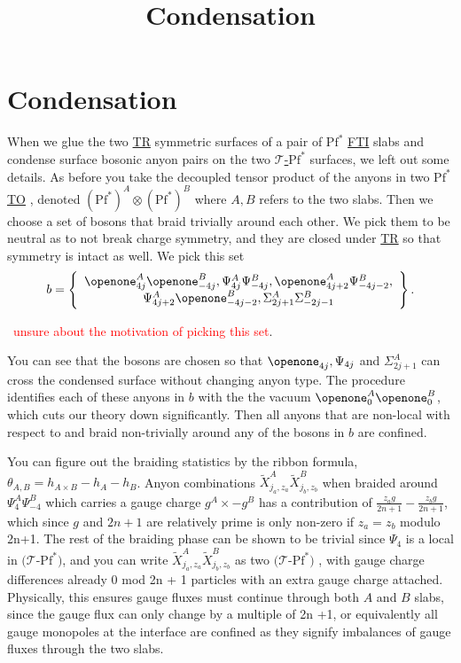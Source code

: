 \documentclass[aps,prl,onecolumn,superscriptaddress,floatfix,12pt,letterpaper,showpacs]{revtex4-1}
\newcommand{\FTI}{\hyperlink{FTI}{FTI} }
\newcommand{\TR}{\hyperlink{TR}{TR} }
\newcommand{\TO}{\hyperlink{TO}{TO} }
\newcommand{\TPf}{\hyperlink{TPf}{$\mathcal{T}$-$\mathrm{Pf}^\ast$} }
\begin{document}
\title{Condensation}

\section{Condensation}

When we glue the two \TR symmetric surfaces of a pair of $\mathrm{Pf}^\ast$ \FTI slabs and condense surface bosonic anyon pairs on the two \TPf surfaces, we left out some details. As before you take the decoupled tensor product of the anyons in two $\mathrm{Pf}^\ast$ \TO, denoted  $(\mathrm{Pf}^\ast)^A\otimes(\mathrm{Pf}^\ast)^B$ where $A,B$ refers to the two slabs. Then we choose a set of bosons that braid trivially around each other. We pick them to be neutral as to not break charge symmetry, and they are closed under \TR so that symmetry is intact as well. We pick this set \
\
\begin{align}
	b=\left\{
		\begin{array}{*{20}c}\openone^A_{4j}\openone^B_{-4j},\Psi^A_{4j}\Psi^B_{-4j},\openone^A_{4j+2}\Psi^B_{-4j-2},				\\\Psi^A_{4j+2}\openone^B_{-4j-2},\Sigma^A_{2j+1}\Sigma^B_{-2j-1}
		\end{array}
	\right\}.\label{bosons}
\end{align}

\
\textcolor{red}{unsure about the motivation of picking this set}.\
\
 


You can see that the bosons are chosen so that $\openone_{4j},\Psi_{4j}$ and $\Sigma^A_{2j+1}$ can cross the condensed surface without changing anyon type. The procedure identifies each of these anyons in $b$ with the the vacuum $\openone^A_{0}\openone^B_{0}$, which cuts our theory down significantly. Then all anyons that are non-local with respect to and braid non-trivially around any of the bosons in $b$ are confined.


 You can figure out the braiding statistics by the ribbon formula, $\theta_{A,B}=h_{A \times B}-h_A-h_B$. Anyon combinations $\tilde{X}^A_{j_a,z_a}\tilde{X}^B_{j_b,z_b}$ when braided around $\Psi^A_{4}\Psi^B_{-4}$ which carries a gauge charge $g^A \times -g^B$ has a contribution of $\frac{z_ag}{2n+1}-\frac{z_bg}{2n+1}$, which since $g$ and $2n+1$ are relatively prime is only non-zero if $z_a =z_b$ modulo 2n+1. The rest of the braiding phase can be shown to be trivial since $\Psi_4$  is a local in $(\mathcal{T}$-$\mathrm{Pf}^\ast)$, and you can write $\tilde{X}^A_{j_a,z_a}\tilde{X}^B_{j_b,z_b}$ as two $(\mathcal{T}$-$\mathrm{Pf}^\ast)$ , with gauge charge differences already 0 mod  2n + 1 particles with an extra gauge charge attached. Physically, this ensures gauge fluxes must continue through both $A$ and $B$ slabs, since the gauge flux can only change by a multiple of 2n +1, or equivalently all gauge monopoles at the interface are confined as they signify imbalances of gauge fluxes through the two slabs.
\end{document}
